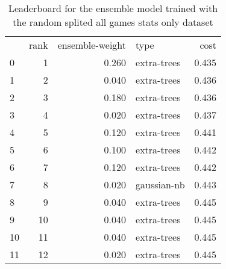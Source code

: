 \begin{table}[]
	\centering
	\begin{tabular}{lrrlr}
		   & rank & ensemble-weight & type        & cost  \\
		0  & 1    & 0.260           & extra-trees & 0.435 \\
		1  & 2    & 0.040           & extra-trees & 0.436 \\
		2  & 3    & 0.180           & extra-trees & 0.436 \\
		3  & 4    & 0.020           & extra-trees & 0.437 \\
		4  & 5    & 0.120           & extra-trees & 0.441 \\
		5  & 6    & 0.100           & extra-trees & 0.442 \\
		6  & 7    & 0.120           & extra-trees & 0.442 \\
		7  & 8    & 0.020           & gaussian-nb & 0.443 \\
		8  & 9    & 0.040           & extra-trees & 0.445 \\
		9  & 10   & 0.040           & extra-trees & 0.445 \\
		10 & 11   & 0.040           & extra-trees & 0.445 \\
		11 & 12   & 0.020           & extra-trees & 0.445 \\
	\end{tabular}

	\caption{Leaderboard for the ensemble model trained with the random splited all games stats only dataset}
	\label{tab:lb-all-games-champ-stats-only-randsplit}
\end{table}

